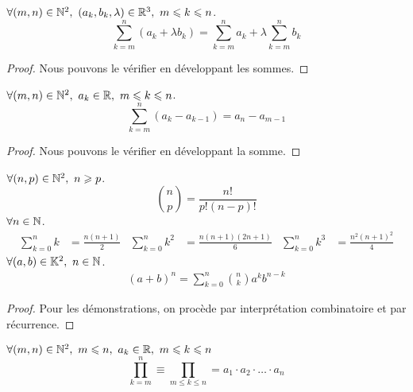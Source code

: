 \begin{proposition}
    $\forall (m, n) \in \mathbb{N}^2,\ (a_k, b_k, \lambda) \in \mathbb{R}^3,\ m \leqslant k \leqslant n$.
    \[ \sum_{k = m}^{n} (a_k + \lambda b_k) = \sum_{k = m}^n a_k + \lambda \sum_{k = m}^n b_k \]
\end{proposition}

\begin{proof}
	Nous pouvons le vérifier en développant les sommes.
\end{proof}

\begin{proposition}
    $\forall (m, n) \in \mathbb{N}^2,\ a_k \in \mathbb{R},\ m \leqslant k \leqslant n$.
    \[ \sum_{k = m}^n (a_k - a_{k - 1}) = a_n - a_{m - 1} \]
\end{proposition}

\begin{proof}
	Nous pouvons le vérifier en développant la somme.
\end{proof}

\begin{proposition}
	$\forall (n, p) \in \mathbb{N}^2,\ n \geqslant p$.
	\[ \binom{n}{p} = \frac{n!}{p!(n - p)!} \]
	$\forall n \in \mathbb{N}$.
	\begin{align*}
		\sum_{k = 0}^{n} k &= \frac{n(n+1)}{2} & 
		\sum_{k = 0}^{n} k^2 &= \frac{n(n+1)(2n+1)}{6} &
		\sum_{k = 0}^{n} k^3 &= \frac{n^2(n+1)^2}{4}
	\end{align*}
	$\forall (a, b) \in \mathbb{K}^2,\ n \in \mathbb{N}$.
	\begin{align*}
		(a + b)^n = \sum_{k = 0}^{n} \binom{n}{k} a^kb^{n-k}
	\end{align*}
\end{proposition}
\begin{proof}
    Pour les démonstrations, on procède par interprétation combinatoire et par récurrence.
\end{proof}

\begin{definition}[Produit]
    $\forall (m, n) \in \mathbb{N}^2,\ m \leqslant n,\ a_k \in \mathbb{R},\ m \leqslant k \leqslant n$
    \[ \prod_{k = m}^{n} \equiv \prod_{m \leq k \leq n} = a_1 \cdot a_2 \cdot \ldots \cdot a_n \]
\end{definition}